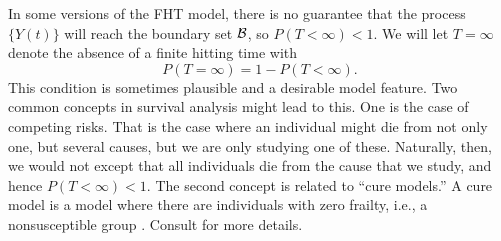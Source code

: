 In some versions of the FHT model, there is no guarantee that the process $\{Y(t)\}$ will reach the boundary set $\mathcal{B}$, so $P(T<\infty)<1$. We will let $T=\infty$ denote the absence of a finite hitting time with
\begin{equation}\label{eq:T-is-infinity}
    P(T=\infty)=1-P(T<\infty).
\end{equation}
This condition is sometimes plausible and a desirable model feature.
Two common concepts in survival analysis might lead to this.
One is the case of competing risks.
That is the case where an individual might die from not only one, but several causes, but we are only studying one of these.
Naturally, then, we would not except that all individuals die from the cause that we study, and hence $P(T<\infty)<1$.
The second concept is related to ``cure models.''
A cure model is a model where there are individuals with zero frailty, i.e., a nonsusceptible group \citep{ABG}.
Consult \citet{maller1996survival} for more details.

